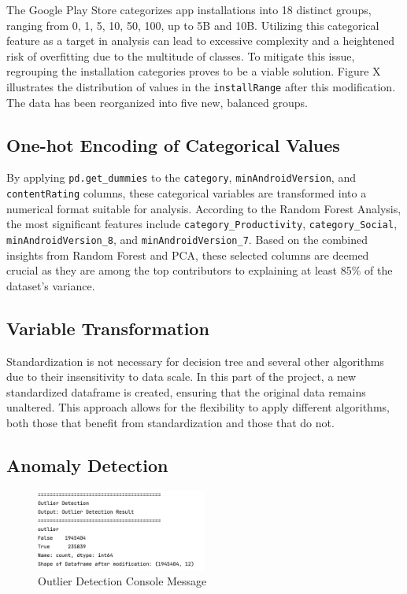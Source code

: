 The Google Play Store categorizes app installations into 18 distinct groups, ranging from 0, 1, 5, 10, 50, 100, up to 5B and 10B. Utilizing this categorical feature as a target in analysis can lead to excessive complexity and a heightened risk of overfitting due to the multitude of classes. To mitigate this issue, regrouping the installation categories proves to be a viable solution. Figure X illustrates the distribution of values in the \texttt{installRange} after this modification. The data has been reorganized into five new, balanced groups.

\subsection{One-hot Encoding of Categorical Values}

By applying \texttt{pd.get\_dummies} to the \texttt{category}, \texttt{minAndroidVersion}, and \texttt{contentRating} columns, these categorical variables are transformed into a numerical format suitable for analysis. According to the Random Forest Analysis, the most significant features include \texttt{category\_Productivity}, \texttt{category\_Social}, \texttt{minAndroidVersion\_8}, and \texttt{minAndroidVersion\_7}. Based on the combined insights from Random Forest and PCA, these selected columns are deemed crucial as they are among the top contributors to explaining at least 85\% of the dataset's variance.

\subsection{Variable Transformation}

Standardization is not necessary for decision tree and several other algorithms due to their insensitivity to data scale. In this part of the project, a new standardized dataframe is created, ensuring that the original data remains unaltered. This approach allows for the flexibility to apply different algorithms, both those that benefit from standardization and those that do not.

\subsection{Anomaly Detection}

\begin{figure}[h]
\centering
\includegraphics[width=0.5\textwidth]{docs//assets/outlier.png}
\caption{Outlier Detection Console Message}
\end{figure}

